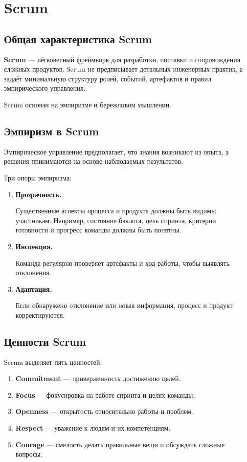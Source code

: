 \documentclass[12pt,a4paper]{article}
\begin{document}
\section{Scrum}

\subsection{Общая характеристика Scrum}

\textbf{Scrum} --- лёгковесный фреймворк для разработки, поставки и сопровождения сложных продуктов. Scrum не предписывает детальных инженерных практик, а задаёт минимальную структуру ролей, событий, артефактов и правил эмпирического управления.

Scrum основан на эмпиризме и бережливом мышлении.

\subsection{Эмпиризм в Scrum}

Эмпирическое управление предполагает, что знания возникают из опыта, а решения принимаются на основе наблюдаемых результатов.

Три опоры эмпиризма:

\begin{enumerate}
    \item \textbf{Прозрачность.}

    Существенные аспекты процесса и продукта должны быть видимы участникам. Например, состояние бэклога, цель спринта, критерии готовности и прогресс команды должны быть понятны.

    \item \textbf{Инспекция.}

    Команда регулярно проверяет артефакты и ход работы, чтобы выявлять отклонения.

    \item \textbf{Адаптация.}

    Если обнаружено отклонение или новая информация, процесс и продукт корректируются.
\end{enumerate}

\subsection{Ценности Scrum}

Scrum выделяет пять ценностей:

\begin{enumerate}
    \item \textbf{Commitment} --- приверженность достижению целей.
    \item \textbf{Focus} --- фокусировка на работе спринта и целях команды.
    \item \textbf{Openness} --- открытость относительно работы и проблем.
    \item \textbf{Respect} --- уважение к людям и их компетенциям.
    \item \textbf{Courage} --- смелость делать правильные вещи и обсуждать сложные вопросы.
\end{enumerate}
\end{document}
